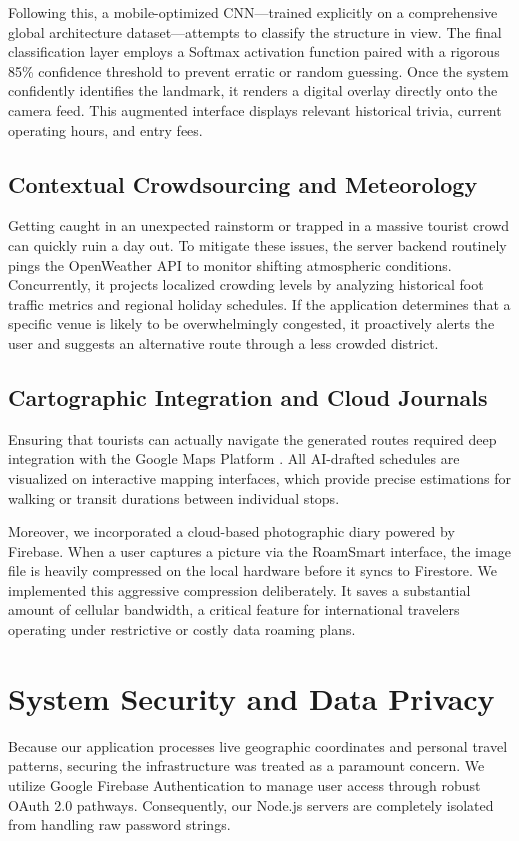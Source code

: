 \documentclass[conference]{IEEEtran}
\begin{document}
Following this, a mobile-optimized CNN---trained explicitly on a comprehensive global architecture dataset---attempts to classify the structure in view. The final classification layer employs a Softmax activation function paired with a rigorous 85\% confidence threshold to prevent erratic or random guessing. Once the system confidently identifies the landmark, it renders a digital overlay directly onto the camera feed. This augmented interface displays relevant historical trivia, current operating hours, and entry fees.

\subsection{Contextual Crowdsourcing and Meteorology}
Getting caught in an unexpected rainstorm or trapped in a massive tourist crowd can quickly ruin a day out. To mitigate these issues, the server backend routinely pings the OpenWeather API \cite{b7} to monitor shifting atmospheric conditions. Concurrently, it projects localized crowding levels by analyzing historical foot traffic metrics and regional holiday schedules. If the application determines that a specific venue is likely to be overwhelmingly congested, it proactively alerts the user and suggests an alternative route through a less crowded district.

\subsection{Cartographic Integration and Cloud Journals}
Ensuring that tourists can actually navigate the generated routes required deep integration with the Google Maps Platform \cite{b6}. All AI-drafted schedules are visualized on interactive mapping interfaces, which provide precise estimations for walking or transit durations between individual stops. 

Moreover, we incorporated a cloud-based photographic diary powered by Firebase. When a user captures a picture via the RoamSmart interface, the image file is heavily compressed on the local hardware before it syncs to Firestore. We implemented this aggressive compression deliberately. It saves a substantial amount of cellular bandwidth, a critical feature for international travelers operating under restrictive or costly data roaming plans.

\section{System Security and Data Privacy}
Because our application processes live geographic coordinates and personal travel patterns, securing the infrastructure was treated as a paramount concern. We utilize Google Firebase Authentication to manage user access through robust OAuth 2.0 pathways. Consequently, our Node.js servers are completely isolated from handling raw password strings. 
\end{document}
